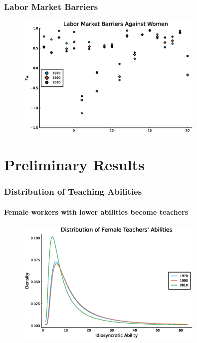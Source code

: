 \documentclass[11pt]{beamer}
\begin{document}
\begin{frame}
\frametitle{Labor Market Barriers}
\label{barriers3}
\begin{figure}
\begin{center}
\includegraphics[width=0.8\textwidth]{tau_w_women_70_10.eps}
\label{ }
\end{center}
\end{figure}
\hyperlink{occupations}{}
\hyperlink{aggprod}{}
\end{frame}

\section{Preliminary Results}

\begin{frame}
\frametitle{Distribution of Teaching Abilities}
\framesubtitle{Female workers with lower abilities become teachers}
\begin{figure}
 \begin{center}
\includegraphics[width=0.8\textwidth]{fT_women_steadystate.eps}
 			\label{ }
 		\end{center}
 	\end{figure}
\end{frame}
\end{document}
